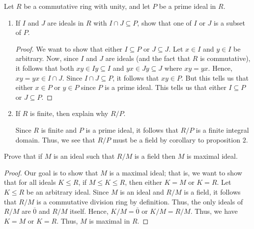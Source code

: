 \documentclass[a4paper]{article}
\begin{document}
\begin{problem}
    Let \( R  \) be a commutative ring with unity, and let \( P  \) be a prime ideal in \( R  \).
    \begin{enumerate}
        \item[(a)] If \( I  \) and \( J  \) are ideals in \( R  \) with \( I \cap J \subseteq P \), show that one of \( I  \) or \( J  \) is a subset of \( P  \).
            \begin{proof}
               We want to show that either \( I \subseteq P  \) or \( J \subseteq J \). Let \( x \in I  \) and \( y \in I  \) be arbitrary. Now, since \( I  \) and \( J  \) are ideals (and the fact that \( R  \) is commutative), it follows that both \( xy \in Iy \subseteq I   \) and \( yx \in Jy \subseteq J   \) where \( x y = yx  \). Hence, \( xy = yx \in I \cap J  \). Since \( I \cap J \subseteq  P  \), it follows that \( xy \in P  \). But this tells us that either \( x \in P  \) or \( y \in P  \) since \( P  \) is a prime ideal. This tells us that either \( I \subseteq  P  \) or \( J \subseteq P  \).
            \end{proof}
        \item[(b)] If \( R  \) is finite, then explain why \( R / P \).
            \begin{solution}
            Since \( R  \) is finite and \( P  \) is a prime ideal, it follows that \( R / P  \) is a finite integral domain. Thus, we see that \( R /P  \) must be a field by corollary to proposition \( 2  \).
            \end{solution}
    \end{enumerate}
\end{problem}

\begin{problem}
    Prove that if \( M  \) is an ideal such that \( R / M \) is a field then \( M  \) is maximal ideal.
\end{problem}
\begin{proof}
Our goal is to show that \( M  \) is a maximal ideal; that is, we want to show that for all ideals \( K \leq R  \), if \( M \leq K \leq R  \), then either \( K =  M \) or \( K = R  \). Let \( K \leq R  \) be an arbitrary ideal. Since \( M  \) is an ideal and \( R / M  \) is a field, it follows that \( R / M   \) is a commutative division ring by definition. Thus, the only ideals of \( R / M  \) are \( \overline{0}  \) and \( R / M  \) itself. Hence, \( K / M = \overline{0} \) or \( K / M = R / M  \). Thus, we have \( K = M  \) or \( K  = R  \). Thus, \( M  \) is maximal in \( R \).  
\end{proof}
\end{document}
